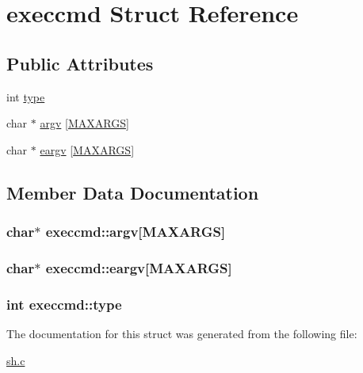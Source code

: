 \hypertarget{structexeccmd}{}\section{execcmd Struct Reference}
\label{structexeccmd}
\subsection*{Public Attributes}
\begin{DoxyCompactItemize}
\item 
int \hyperlink{structexeccmd_a9db03fe1a8bff63e9205fc98eeb19741}{type}
\item 
char $\ast$ \hyperlink{structexeccmd_a00e53af4bc0e28bbd6842bdceaee1ea9}{argv} \mbox{[}\hyperlink{sh_8c_a41101847771d39a4f0a7f9395061c629}{M\+A\+X\+A\+R\+GS}\mbox{]}
\item 
char $\ast$ \hyperlink{structexeccmd_ab3444b3d0c478e5338f55b7dffe70521}{eargv} \mbox{[}\hyperlink{sh_8c_a41101847771d39a4f0a7f9395061c629}{M\+A\+X\+A\+R\+GS}\mbox{]}
\end{DoxyCompactItemize}


\subsection{Member Data Documentation}
\subsubsection[{\texorpdfstring{argv}{argv}}]{\setlength{\rightskip}{0pt plus 5cm}char$\ast$ execcmd\+::argv\mbox{[}{\bf M\+A\+X\+A\+R\+GS}\mbox{]}}\hypertarget{structexeccmd_a00e53af4bc0e28bbd6842bdceaee1ea9}{}\label{structexeccmd_a00e53af4bc0e28bbd6842bdceaee1ea9}
\subsubsection[{\texorpdfstring{eargv}{eargv}}]{\setlength{\rightskip}{0pt plus 5cm}char$\ast$ execcmd\+::eargv\mbox{[}{\bf M\+A\+X\+A\+R\+GS}\mbox{]}}\hypertarget{structexeccmd_ab3444b3d0c478e5338f55b7dffe70521}{}\label{structexeccmd_ab3444b3d0c478e5338f55b7dffe70521}
\subsubsection[{\texorpdfstring{type}{type}}]{\setlength{\rightskip}{0pt plus 5cm}int execcmd\+::type}\hypertarget{structexeccmd_a9db03fe1a8bff63e9205fc98eeb19741}{}\label{structexeccmd_a9db03fe1a8bff63e9205fc98eeb19741}


The documentation for this struct was generated from the following file\+:\begin{DoxyCompactItemize}
\item 
\hyperlink{sh_8c}{sh.\+c}\end{DoxyCompactItemize}
